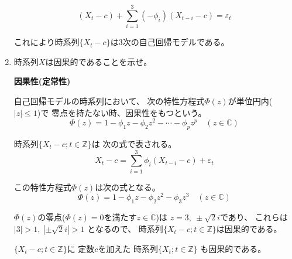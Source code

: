 \documentclass[12pt,b5paper]{ltjsarticle}
\begin{document}
\begin{enumerate}
      \begin{equation}
       (X_{t}-c) +\sum_{i=1}^{3}(-\phi_{i})(X_{t-i}-c)=\varepsilon_{t}
      \end{equation}

      これにより時系列$\{X_{t}-c\}$は3次の自己回帰モデルである。

      \hrulefill

 \item
      時系列$X$は因果的であることを示せ。

      \dotfill

      \textbf{因果性(定常性)}

      自己回帰モデルの時系列において、
      次の特性方程式$\Phi(z)$が単位円内($\lvert z\rvert \leq 1$)で
      零点を持たない時、因果性をもつという。
      \begin{equation}
       \Phi (z) = 1-\phi_1 z -\phi_2 z^2 -\cdots- \phi_p z^p
        \quad (z\in\mathbb{C})
      \end{equation}

      \dotfill

      時系列$\{ X_{t}-c ; t\in\mathbb{Z} \}$は
      次の式で表される。
      \begin{equation}
       X_{t}-c = \sum_{i=1}^{3}\phi_{i}(X_{t-i}-c)+\varepsilon_{t}
      \end{equation}

      この特性方程式$\Phi(z)$は次の式となる。
      \begin{equation}
       \Phi (z) = 1-\phi_1 z -\phi_2 z^2 - \phi_3 z^3
        \quad (z\in\mathbb{C})
      \end{equation}

      $\Phi(z)$の零点($\Phi(z)=0$を満たす$z\in\mathbb{C}$)は
      $z=3,\ \pm\sqrt{2}i$であり、
      これらは
      $\left\lvert 3 \right\rvert >1,\
      \left\lvert \pm\sqrt{2}i \right\rvert >1$
      となるので、
      時系列$\{ X_{t}-c ; t\in\mathbb{Z} \}$は因果的である。

      $\{ X_{t}-c ; t\in\mathbb{Z} \}$に
      定数$c$を加えた
      時系列$\{ X_{t} ; t\in\mathbb{Z} \}$
      も因果的である。
      

      \hrulefill

\end{enumerate}
\end{document}
